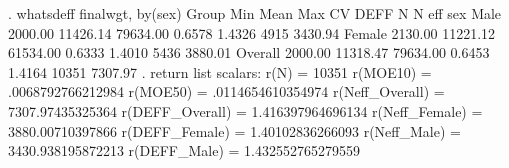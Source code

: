 . whatsdeff finalwgt, by(sex)
{\smallskip}
    Group     {\VBAR}   Min     {\VBAR}   Mean    {\VBAR}   Max     {\VBAR}    CV   {\VBAR}   DEFF  {\VBAR}   N   {\VBAR}  N eff
sex           {\VBAR}           {\VBAR}           {\VBAR}           {\VBAR}         {\VBAR}         {\VBAR}       {\VBAR}
         Male {\VBAR}   2000.00 {\VBAR}  11426.14 {\VBAR}  79634.00 {\VBAR}  0.6578 {\VBAR}  1.4326 {\VBAR}  4915 {\VBAR} 3430.94
       Female {\VBAR}   2130.00 {\VBAR}  11221.12 {\VBAR}  61534.00 {\VBAR}  0.6333 {\VBAR}  1.4010 {\VBAR}  5436 {\VBAR} 3880.01
      Overall {\VBAR}   2000.00 {\VBAR}  11318.47 {\VBAR}  79634.00 {\VBAR}  0.6453 {\VBAR}  1.4164 {\VBAR} 10351 {\VBAR} 7307.97
{\smallskip}
. return list
{\smallskip}
scalars:
                  r(N) =  10351
              r(MOE10) =  .0068792766212984
              r(MOE50) =  .0114654610354974
       r(Neff_Overall) =  7307.97435325364
       r(DEFF_Overall) =  1.416397964696134
        r(Neff_Female) =  3880.00710397866
        r(DEFF_Female) =  1.40102836266093
          r(Neff_Male) =  3430.938195872213
          r(DEFF_Male) =  1.432552765279559
{\smallskip}
